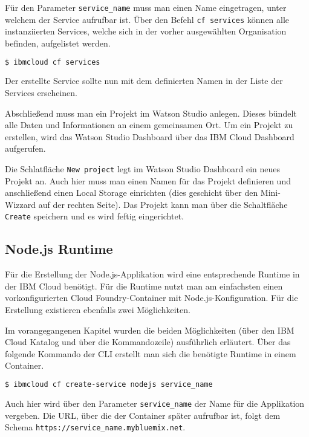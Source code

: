 Für den Parameter \texttt{service\_name} muss man einen Name eingetragen, unter welchem der Service aufrufbar ist. Über
den Befehl \texttt{cf services} können alle instanziierten Services, welche sich in der vorher ausgewählten Organisation
befinden, aufgelistet werden.

\begin{lstlisting}[language=bash, caption=Auflisten aller Services in einer Organisation, label=Auflisten aller Services in einer Organisation]
    $ ibmcloud cf services
\end{lstlisting}

Der erstellte Service sollte nun mit dem definierten Namen in der Liste der Services erscheinen.

Abschließend muss man ein Projekt im Watson Studio anlegen. Dieses bündelt alle Daten und Informationen an einem
gemeinsamen Ort. Um ein Projekt zu erstellen, wird das Watson Studio Dashboard über das IBM Cloud Dashboard aufgerufen.

Die Schlatfläche \texttt{New project} legt im Watson Studio Dashboard ein neues Projekt an. Auch hier muss man einen Namen
für das Projekt definieren und anschließend einen Local Storage einrichten (dies geschicht über den Mini-Wizzard auf der
rechten Seite). Das Projekt kann man über die Schaltfläche \texttt{Create} speichern und es wird feftig eingerichtet.

\subsection{Node.js Runtime}
\label{ssc:nodejs_runtime}
Für die Erstellung der Node.js-Applikation wird eine entsprechende Runtime in der IBM Cloud benötigt. Für die Runtime
nutzt man am einfachsten einen vorkonfigurierten Cloud Foundry-Container mit Node.js-Konfiguration. Für die Erstellung
existieren ebenfalls zwei Möglichkeiten.

Im vorangegangenen Kapitel wurden die beiden Möglichkeiten (über den IBM Cloud Katalog und über die Kommandozeile)
ausführlich erläutert. Über das folgende Kommando der CLI erstellt man sich die benötigte Runtime in einem Container.

\begin{lstlisting}[language=bash, caption=Instanziierung der Node.js Runtime, label=Instanziierung der Node.JS Runtime]
    $ ibmcloud cf create-service nodejs service_name
\end{lstlisting}

Auch hier wird über den Parameter \texttt{service\_name} der Name für die Applikation vergeben. Die URL, über die
der Container später aufrufbar ist, folgt dem Schema \texttt{https://service\_name.mybluemix.net}.

